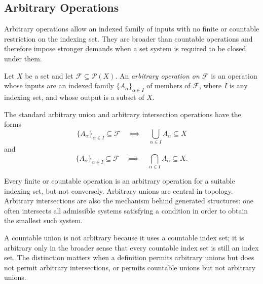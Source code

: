 \subsection{Arbitrary Operations}

\begin{remark*}[Exposition]
Arbitrary operations allow an indexed family of inputs with no finite or
countable restriction on the indexing set.  They are broader than countable
operations and therefore impose stronger demands when a set system is required
to be closed under them.
\end{remark*}

\begin{definition}\label{def:arbitrary-operation-on-family}
Let \(X\) be a set and let \(\mathcal{F}\subseteq\mathcal{P}(X)\).  An
\emph{arbitrary operation on \(\mathcal{F}\)} is an operation whose inputs are
an indexed family \(\{A_\alpha\}_{\alpha\in I}\) of members of
\(\mathcal{F}\), where \(I\) is any indexing set, and whose output is a subset
of \(X\).
\end{definition}

\begin{remark*}
The standard arbitrary union and arbitrary intersection operations have the
forms
\[
  \{A_\alpha\}_{\alpha\in I}\subseteq\mathcal{F}
  \quad\Longmapsto\quad
  \bigcup_{\alpha\in I}A_\alpha\subseteq X
\]
and
\[
  \{A_\alpha\}_{\alpha\in I}\subseteq\mathcal{F}
  \quad\Longmapsto\quad
  \bigcap_{\alpha\in I}A_\alpha\subseteq X.
\]
\end{remark*}

\begin{remark*}[Interpretation]
Every finite or countable operation is an arbitrary operation for a suitable
indexing set, but not conversely.  Arbitrary unions are central in topology.
Arbitrary intersections are also the mechanism behind generated structures:
one often intersects all admissible systems satisfying a condition in order to
obtain the smallest such system.
\end{remark*}

\begin{remark*}
A countable union is not arbitrary because it uses a countable index set; it is
arbitrary only in the broader sense that every countable index set is still an
index set.  The distinction matters when a definition permits arbitrary
unions but does not permit arbitrary intersections, or permits countable
unions but not arbitrary unions.
\end{remark*}

